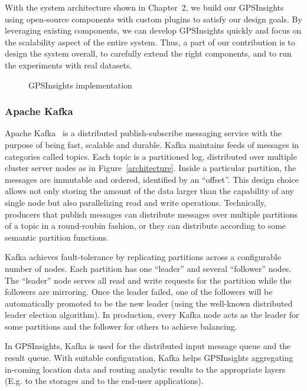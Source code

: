 \documentclass{acm_proc_article-sp}
\begin{document}
With the system architecture shown in Chapter~2, we build our GPSInsights using open-source components with custom plugins to satisfy our design goals. By leveraging existing components, we can develop GPSInsights quickly and focus on the scalability aspect of the entire system. Thus, a part of our contribution is to design the system overall, to carefully extend the right components, and to run the experiments with real datasets.  

\begin{figure}[h]
\centering
{}
\caption{GPSInsights implementation}
\end{figure}

\subsubsection{Apache Kafka} 

Apache Kafka~\cite{kafkapaper,kafkaweb} is a distributed publish-subscribe messaging service with the purpose of being fast, scalable and durable. Kafka maintains feeds of messages in categories called topics. Each topic is a partitioned log, distributed over multiple cluster server nodes as in Figure~\ref{architecture}. Inside a particular partition, the messages are immutable and ordered, identified by an ``offset''. This design choice allows not only storing the amount of the data larger than the capability of any single node but also parallelizing read and write operations. Technically, producers that publish messages can distribute messages over multiple partitions of a topic in a round-roubin fashion, or they can distribute according to some semantic partition functions.

Kafka achieves fault-tolerance by replicating partitions across a configurable number of nodes. Each partition has one ``leader'' and several ``follower'' nodes. The ``leader'' node serves all read and write requests for the partition while the followers are mirroring. Once the leader failed, one of the followers will be automatically promoted to be the new leader (using the well-known distributed leader election algorithm). In production, every Kafka node acts as the leader for some partitions and the follower for others to achieve balancing. 

In GPSInsights, Kafka is used for the distributed input message queue and the result queue. With suitable configuration, Kafka helps GPSInsights aggregating in-coming location data and routing analytic results to the appropriate layers (E.g. to the storages and to the end-user applications).
\end{document}
